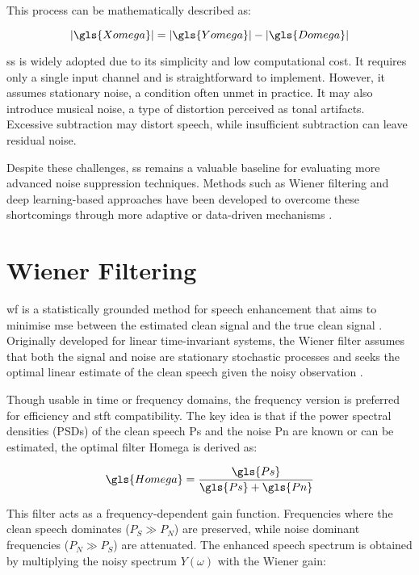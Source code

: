 This process can be mathematically described as:

\begin{equation}
    |\gls{Xomega}| = |\gls{Yomega}| - |\gls{Domega}|
\end{equation}

\gls{ss} is widely adopted due to its simplicity and low computational cost. It requires only a single input channel and is straightforward to implement. However, it assumes stationary noise, a condition often unmet in practice. It may also introduce musical noise, a type of distortion perceived as tonal artifacts. Excessive subtraction may distort speech, while insufficient subtraction can leave residual noise.

Despite these challenges, \gls{ss} remains a valuable baseline for evaluating more advanced noise suppression techniques. Methods such as Wiener filtering and deep learning-based approaches have been developed to overcome these shortcomings through more adaptive or data-driven mechanisms \cite{loizou2013speech}.


\section{Wiener Filtering}
\label{sec:wiener_filtering}

\gls{wf} is a statistically grounded method for speech enhancement that aims to minimise \gls{mse} between the estimated clean signal and the true clean signal \cite{loizou2013speech}. Originally developed for linear time-invariant systems, the Wiener filter assumes that both the signal and noise are stationary stochastic processes and seeks the optimal linear estimate of the clean speech given the noisy observation \cite{dubey2016evaluation}.

Though usable in time or frequency domains, the frequency version is preferred for efficiency and \gls{stft} compatibility. The key idea is that if the power spectral densities (PSDs) of the clean speech \gls{Ps} and the noise \gls{Pn} are known or can be estimated, the optimal filter \gls{Homega} is derived as:

\begin{equation}
    \gls{Homega} = \frac{\gls{Ps}}{\gls{Ps} + \gls{Pn}}
\end{equation}

This filter acts as a frequency-dependent gain function. Frequencies where the clean speech dominates (\(P_S \gg P_N\)) are preserved, while noise dominant frequencies (\(P_N \gg P_S\)) are attenuated. The enhanced speech spectrum is obtained by multiplying the noisy spectrum \(Y(\omega)\) with the Wiener gain:

